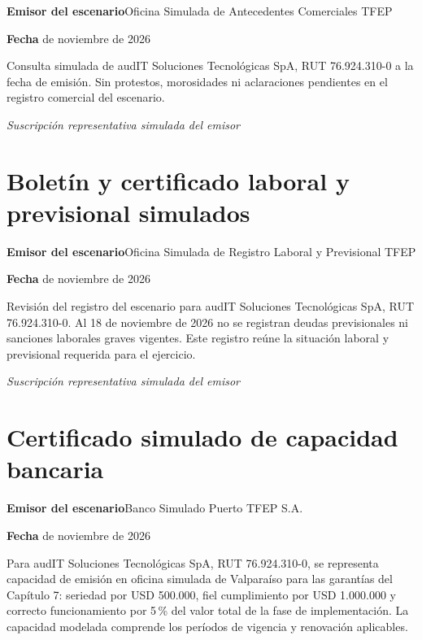 \rotuloSimuladoSobreUno
\noindent\textbf{Emisor del escenario}\enspace Oficina Simulada de Antecedentes Comerciales TFEP\par
\noindent\textbf{Fecha} de noviembre de 2026\par
\medskip

Consulta simulada de audIT Soluciones Tecnológicas SpA, RUT 76.924.310-0 a la fecha de emisión. Sin protestos, morosidades ni aclaraciones pendientes en el registro comercial del escenario.

\medskip
\noindent\textit{Suscripción representativa simulada del emisor}\par
\label{adm:comercial-fin}

\clearpage
\section*{Boletín y certificado laboral y previsional simulados}\label{adm:laboral}

\rotuloSimuladoSobreUno
\noindent\textbf{Emisor del escenario}\enspace Oficina Simulada de Registro Laboral y Previsional TFEP\par
\noindent\textbf{Fecha} de noviembre de 2026\par
\medskip

Revisión del registro del escenario para audIT Soluciones Tecnológicas SpA, RUT 76.924.310-0. Al 18 de noviembre de 2026 no se registran deudas previsionales ni sanciones laborales graves vigentes. Este registro reúne la situación laboral y previsional requerida para el ejercicio.

\medskip
\noindent\textit{Suscripción representativa simulada del emisor}\par
\label{adm:laboral-fin}

\clearpage
\section*{Certificado simulado de capacidad bancaria}\label{adm:capacidad}

\rotuloSimuladoSobreUno
\noindent\textbf{Emisor del escenario}\enspace Banco Simulado Puerto TFEP S.A.\par
\noindent\textbf{Fecha} de noviembre de 2026\par
\medskip

Para audIT Soluciones Tecnológicas SpA, RUT 76.924.310-0, se representa capacidad de emisión en oficina simulada de Valparaíso para las garantías del Capítulo 7: seriedad por USD 500.000, fiel cumplimiento por USD 1.000.000 y correcto funcionamiento por 5\,\% del valor total de la fase de implementación. La capacidad modelada comprende los períodos de vigencia y renovación aplicables.

